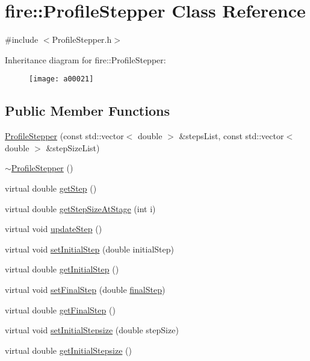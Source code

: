 \hypertarget{a00021}{}\section{fire\+:\+:Profile\+Stepper Class Reference}
\label{a00021}


{\ttfamily \#include $<$Profile\+Stepper.\+h$>$}

Inheritance diagram for fire\+:\+:Profile\+Stepper\+:\begin{figure}[H]
\begin{center}
\leavevmode
\texttt{[image: a00021]}
\end{center}
\end{figure}
\subsection*{Public Member Functions}
\begin{DoxyCompactItemize}
\item 
\hyperlink{a00021_a5bba5babbcb293b5e6a535cc4d06c55f}{Profile\+Stepper} (const std\+::vector$<$ double $>$ \&steps\+List, const std\+::vector$<$ double $>$ \&step\+Size\+List)
\item 
\hyperlink{a00021_a6838143d952dec2519a43c576a1f1546}{$\sim$\+Profile\+Stepper} ()
\item 
virtual double \hyperlink{a00021_a9096ad65a3fcf63678b600cbe0c33961}{get\+Step} ()
\item 
virtual double \hyperlink{a00021_adaa1a23c068977ecc6809dd8eecab49d}{get\+Step\+Size\+At\+Stage} (int i)
\item 
virtual void \hyperlink{a00021_a2c13fd4da5550f1e58df2b54bbfe4c2c}{update\+Step} ()
\item 
virtual void \hyperlink{a00021_adf2f78648d9539282225117c0fd243af}{set\+Initial\+Step} (double initial\+Step)
\item 
virtual double \hyperlink{a00021_af24660fa4bd027f877d5c1bdeb286cf5}{get\+Initial\+Step} ()
\item 
virtual void \hyperlink{a00021_af8203296b4f3bef53bafab7cb654cc97}{set\+Final\+Step} (double \hyperlink{a00021_a4f2347f039417fe9cdd16d3ca74a072d}{final\+Step})
\item 
virtual double \hyperlink{a00021_ae6f257aca7b3bb62a851169a01bcaacf}{get\+Final\+Step} ()
\item 
virtual void \hyperlink{a00021_a55c44fd97d8b6a474243ad0da48b039d}{set\+Initial\+Stepsize} (double step\+Size)
\item 
virtual double \hyperlink{a00021_a86e7035366907a08a36722655746271e}{get\+Initial\+Stepsize} ()
\end{DoxyCompactItemize}

